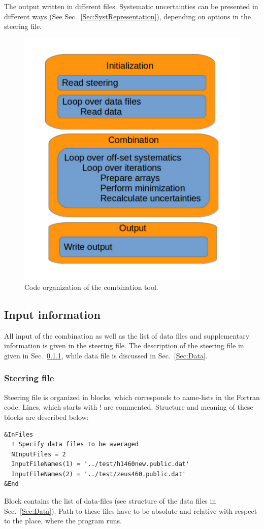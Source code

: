The output written in different files. Systematic uncertainties can be presented in different ways (See Sec.~\ref{Sec:SystRepresentation}), depending on options in the steering file.


\begin{figure}
  \centering
\includegraphics[width=0.65\linewidth]{figures/code.pdf}
  \caption{Code organization of the combination tool.}
  \label{fig:code}
\end{figure}


\subsection{Input information}
\label{Sec:Input}

All input of the combination as well as the list of data files and supplementary information is given in the steering file. The description of the steering file in given in Sec.~\ref{Sec:Steerign}, while data file is discussed in Sec.~\ref{Sec:Data}.

\subsubsection{Steering file}
\label{Sec:Steerign}

Steering file is organized in blocks, which corresponds to name-lists in the Fortran code. Lines, which starts with ! are commented. Structure and meaning of these blocks are described below:

\begin{verbatim}
&InFiles
  ! Specify data files to be averaged
  NInputFiles = 2
  InputFileNames(1) = '../test/h1460new.public.dat'
  InputFileNames(2) = '../test/zeus460.public.dat'
&End
\end{verbatim}
Block contains the list of data-files (see structure of the data files in Sec.~\ref{Sec:Data}). Path to these files have to be absolute and relative with respect to the place, where the program runs.


